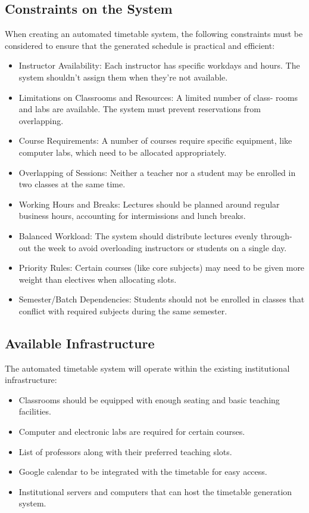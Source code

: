 \documentclass[a4paper,12pt]{article}
\begin{document}
\subsection{Constraints on the System}
When creating an automated timetable system, the following constraints must
be considered to ensure that the generated schedule is practical and efficient:
\begin{itemize}
    \item Instructor Availability: Each instructor has specific workdays and hours.
The system shouldn’t assign them when they’re not available.
\item Limitations on Classrooms and Resources: A limited number of class-
rooms and labs are available. The system must prevent reservations from
overlapping.
\item Course Requirements: A number of courses require specific equipment, like
computer labs, which need to be allocated appropriately.
\item Overlapping of Sessions: Neither a teacher nor a student may be enrolled
in two classes at the same time.
\item Working Hours and Breaks: Lectures should be planned around regular
business hours, accounting for intermissions and lunch breaks.
\item Balanced Workload: The system should distribute lectures evenly through-
out the week to avoid overloading instructors or students on a single day.
\item Priority Rules: Certain courses (like core subjects) may need to be given
more weight than electives when allocating slots.
\item Semester/Batch Dependencies: Students should not be enrolled in classes
that conflict with required subjects during the same semester.
\end{itemize}
\subsection{Available Infrastructure}
The automated timetable system will operate within the existing institutional
infrastructure:
\begin{itemize}
    \item Classrooms should be equipped with enough seating and basic teaching
facilities.
\item Computer and electronic labs are required for certain courses.
\item List of professors along with their preferred teaching slots.
\item Google calendar to be integrated with the timetable for easy access.
\item Institutional servers and computers that can host the timetable generation
system.
\end{itemize}
\newpage
\end{document}
